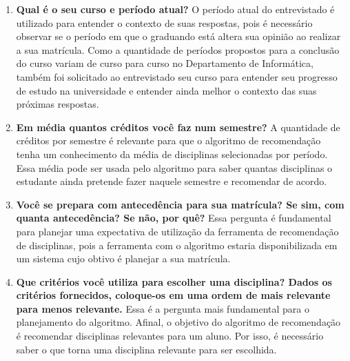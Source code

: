 \begin{enumerate}
    \item \textbf{Qual é o seu curso e período atual?} O período atual do entrevistado é utilizado para entender o contexto de suas respostas, pois é necessário observar se o período em que o graduando está altera sua opinião ao realizar a sua matrícula. Como a quantidade de períodos propostos para a conclusão do curso variam de curso para curso no Departamento de Informática, também foi solicitado ao entrevistado seu curso para entender seu progresso de estudo na universidade e entender ainda melhor o contexto das suas próximas respostas.
        
    
    \item \textbf{Em média quantos créditos você faz num semestre?} A quantidade de créditos por semestre é relevante para que o algoritmo de recomendação tenha um conhecimento da média de disciplinas selecionadas por período. Essa média pode ser usada pelo algoritmo para saber quantas disciplinas o estudante ainda pretende fazer naquele semestre e recomendar de acordo.
    
    \item \textbf{Você se prepara com anteced\^encia para sua matr\'icula? Se sim, com quanta anteced\^encia? Se não, por quê?} Essa pergunta é fundamental para planejar uma expectativa de utilização da ferramenta de recomendação de disciplinas, pois a ferramenta com o algoritmo estaria disponibilizada em um sistema cujo obtivo é planejar a sua matr\'icula.
    
    
    \item \textbf{Que crit\'erios você utiliza para escolher uma disciplina? Dados os critérios fornecidos, coloque-os em uma ordem de mais relevante para menos relevante.} Essa é a pergunta mais fundamental para o planejamento do algoritmo. Afinal, o objetivo do algoritmo de recomendação é recomendar disciplinas relevantes para um aluno. Por isso, é necessário saber o que torna uma disciplina relevante para ser escolhida.
        

\end{enumerate}
